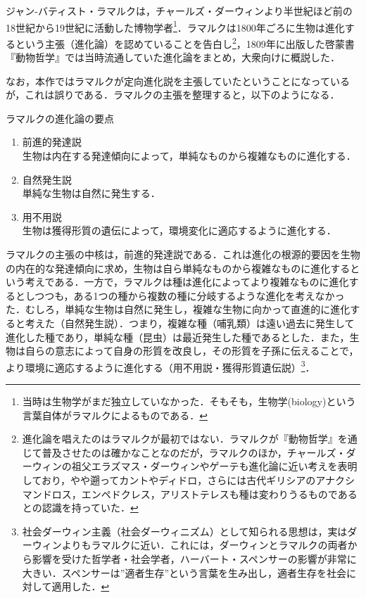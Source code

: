 \documentclass[10pt, a5paper, twoside]{ltjsarticle}
\begin{document}
            ジャン-バティスト・ラマルクは，チャールズ・ダーウィンより半世紀ほど前の18世紀から19世紀に活動した博物学者\footnote{当時は生物学がまだ独立していなかった．そもそも，生物学(biology)という言葉自体がラマルクによるものである．}．ラマルクは1800年ごろに生物は進化するという主張（進化論）を認めていることを告白し\footnote{進化論を唱えたのはラマルクが最初ではない．ラマルクが『動物哲学』を通じて普及させたのは確かなことなのだが，ラマルクのほか，チャールズ・ダーウィンの祖父エラズマス・ダーウィンやゲーテも進化論に近い考えを表明しており，やや遡ってカントやディドロ，さらには古代ギリシアのアナクシマンドロス，エンペドクレス，アリストテレスも種は変わりうるものであるとの認識を持っていた\cite{sarashina}．}，1809年に出版した啓蒙書『動物哲学』\cite{lamarck}では当時流通していた進化論をまとめ，大衆向けに概説した．

            なお，本作ではラマルクが定向進化説を主張していたということになっているが，これは誤りである．ラマルクの主張を整理すると，以下のようになる\cite{mori, kawada}．

            \begin{clm}{ラマルクの進化論の要点}{}
                \begin{enumerate}
                    \item 前進的発達説\\生物は内在する発達傾向によって，単純なものから複雑なものに進化する．
                    \item 自然発生説\\単純な生物は自然に発生する．
                    \item 用不用説\\生物は獲得形質の遺伝によって，環境変化に適応するように進化する．
                \end{enumerate}
            \end{clm}

            ラマルクの主張の中核は，前進的発達説である．これは進化の根源的要因を生物の内在的な発達傾向に求め，生物は自ら単純なものから複雑なものに進化するという考えである．一方で，ラマルクは種は進化によってより複雑なものに進化するとしつつも，ある1つの種から複数の種に分岐するような進化を考えなかった．むしろ，単純な生物は自然に発生し，複雑な生物に向かって直進的に進化すると考えた（自然発生説）．つまり，複雑な種（哺乳類）は遠い過去に発生して進化した種であり，単純な種（昆虫）は最近発生した種であるとした．また，生物は自らの意志によって自身の形質を改良し，その形質を子孫に伝えることで，より環境に適応するように進化する（用不用説・獲得形質遺伝説）\footnote{社会ダーウィン主義（社会ダーウィニズム）として知られる思想は，実はダーウィンよりもラマルクに近い．これには，ダーウィンとラマルクの両者から影響を受けた哲学者・社会学者，ハーバート・スペンサーの影響が非常に大きい．スペンサーは”適者生存”という言葉を生み出し，適者生存を社会に対して適用した．}．
\end{document}
